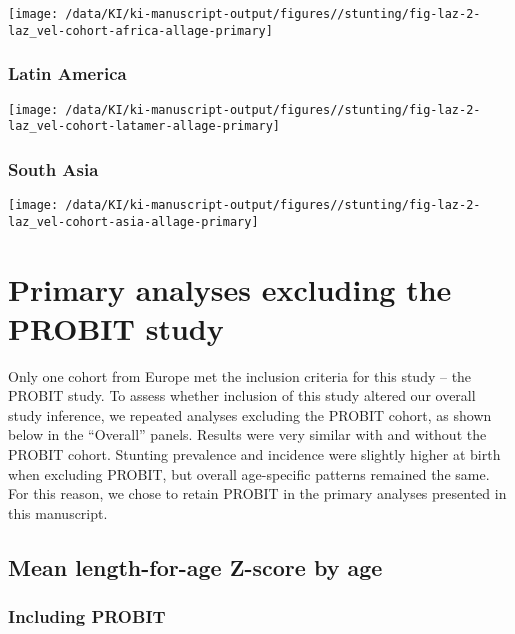 \documentclass[
  9pt,
]{book}
\begin{document}
\texttt{[image: /data/KI/ki-manuscript-output/figures//stunting/fig-laz-2-laz\_vel-cohort-africa-allage-primary]}

\hypertarget{latin-america-4}{%
\subsection{Latin America}\label{latin-america-4}}

\texttt{[image: /data/KI/ki-manuscript-output/figures//stunting/fig-laz-2-laz\_vel-cohort-latamer-allage-primary]}

\hypertarget{south-asia-4}{%
\subsection{South Asia}\label{south-asia-4}}

\texttt{[image: /data/KI/ki-manuscript-output/figures//stunting/fig-laz-2-laz\_vel-cohort-asia-allage-primary]}

\hypertarget{exclude-PROBIT}{%
\chapter{Primary analyses excluding the PROBIT study}\label{exclude-PROBIT}}

\raggedright

Only one cohort from Europe met the inclusion criteria for this study -- the PROBIT study. To assess whether inclusion of this study altered our overall study inference, we repeated analyses excluding the PROBIT cohort, as shown below in the ``Overall'' panels. Results were very similar with and without the PROBIT cohort. Stunting prevalence and incidence were slightly higher at birth when excluding PROBIT, but overall age-specific patterns remained the same. For this reason, we chose to retain PROBIT in the primary analyses presented in this manuscript.

\hypertarget{mean-length-for-age-z-score-by-age-1}{%
\section{Mean length-for-age Z-score by age}\label{mean-length-for-age-z-score-by-age-1}}

\hypertarget{including-probit}{%
\subsection{Including PROBIT}\label{including-probit}}
\end{document}
